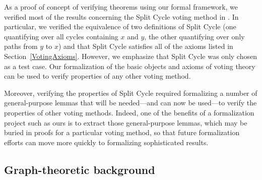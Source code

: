 \documentclass[runningheads]{llncs}
\begin{document}

As a proof of concept of verifying theorems using our formal framework, we verified most of the results concerning the Split Cycle voting method in \cite{HP2020b}. In particular, we verified the equivalence of two definitions of Split Cycle (one quantifying over all cycles containing $x$ and $y$, the other quantifying over only paths from $y$ to $x$) and that Split Cycle satisfies all of the axioms listed in Section~\ref{VotingAxioms}. However, we emphasize that Split Cycle was only chosen as a test case. Our formalization of the basic objects and axioms of voting theory can be used to verify properties of any other voting method. 

Moreover, verifying the properties of Split Cycle required formalizing a number of general-purpose lemmas that will be needed---and can now be used---to verify the properties of other voting methods. Indeed, one of the benefits of a formalization project such as ours is to extract those general-purpose lemmas, which may be buried in proofs for a particular voting method, so that future formalization efforts can move more quickly to formalizing sophisticated results.


\subsection{Graph-theoretic background}
\end{document}
